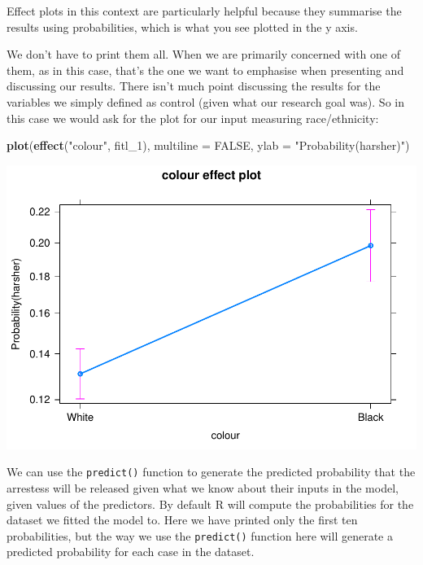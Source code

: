 \documentclass[]{book}
\newenvironment{Shaded}{\begin{snugshade}}{\end{snugshade}}
\newcommand{\DataTypeTok}[1]{\textcolor[rgb]{0.13,0.29,0.53}{#1}}
\newcommand{\DecValTok}[1]{\textcolor[rgb]{0.00,0.00,0.81}{#1}}
\newcommand{\KeywordTok}[1]{\textcolor[rgb]{0.13,0.29,0.53}{\textbf{#1}}}
\newcommand{\NormalTok}[1]{#1}
\newcommand{\OtherTok}[1]{\textcolor[rgb]{0.56,0.35,0.01}{#1}}
\newcommand{\StringTok}[1]{\textcolor[rgb]{0.31,0.60,0.02}{#1}}
\theoremstyle{definition}
\theoremstyle{definition}
\theoremstyle{definition}
\theoremstyle{remark}
\begin{document}
Effect plots in this context are particularly helpful because they
summarise the results using probabilities, which is what you see plotted
in the y axis.

We don't have to print them all. When we are primarily concerned with
one of them, as in this case, that's the one we want to emphasise when
presenting and discussing our results. There isn't much point discussing
the results for the variables we simply defined as control (given what
our research goal was). So in this case we would ask for the plot for
our input measuring race/ethnicity:

\begin{Shaded}
\begin{Highlighting}[]
\KeywordTok{plot}\NormalTok{(}\KeywordTok{effect}\NormalTok{(}\StringTok{"colour"}\NormalTok{, fitl_}\DecValTok{1}\NormalTok{), }\DataTypeTok{multiline =} \OtherTok{FALSE}\NormalTok{, }\DataTypeTok{ylab =} \StringTok{"Probability(harsher)"}\NormalTok{)}
\end{Highlighting}
\end{Shaded}

\includegraphics{09-logistic_files/figure-latex/unnamed-chunk-13-1.pdf}

We can use the \texttt{predict()} function to generate the predicted
probability that the arrestess will be released given what we know about
their inputs in the model, given values of the predictors. By default R
will compute the probabilities for the dataset we fitted the model to.
Here we have printed only the first ten probabilities, but the way we
use the \texttt{predict()} function here will generate a predicted
probability for each case in the dataset.
\end{document}
